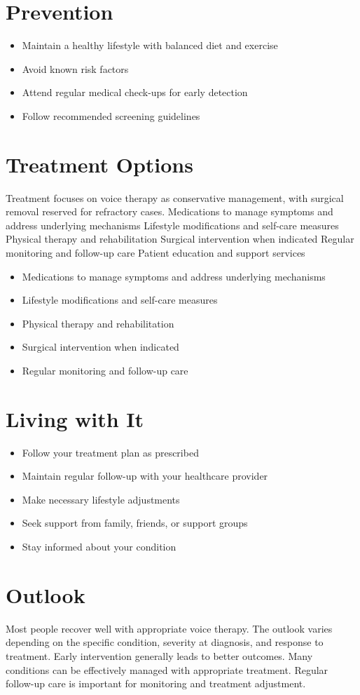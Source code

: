 \section{Prevention}
\begin{itemize}[noitemsep]
  \item Maintain a healthy lifestyle with balanced diet and exercise
  \item Avoid known risk factors
  \item Attend regular medical check-ups for early detection
  \item Follow recommended screening guidelines
\end{itemize}
\section{Treatment Options}
Treatment focuses on voice therapy as conservative management, with surgical removal reserved for refractory cases. Medications to manage symptoms and address underlying mechanisms Lifestyle modifications and self-care measures Physical therapy and rehabilitation Surgical intervention when indicated Regular monitoring and follow-up care Patient education and support services

\begin{itemize}[noitemsep]
  \item Medications to manage symptoms and address underlying mechanisms
  \item Lifestyle modifications and self-care measures
  \item Physical therapy and rehabilitation
  \item Surgical intervention when indicated
  \item Regular monitoring and follow-up care
\end{itemize}
\section{Living with It}
\begin{itemize}[noitemsep]
  \item Follow your treatment plan as prescribed
  \item Maintain regular follow-up with your healthcare provider
  \item Make necessary lifestyle adjustments
  \item Seek support from family, friends, or support groups
  \item Stay informed about your condition
\end{itemize}
\section{Outlook}
Most people recover well with appropriate voice therapy. The outlook varies depending on the specific condition, severity at diagnosis, and response to treatment. Early intervention generally leads to better outcomes. Many conditions can be effectively managed with appropriate treatment. Regular follow-up care is important for monitoring and treatment adjustment.
